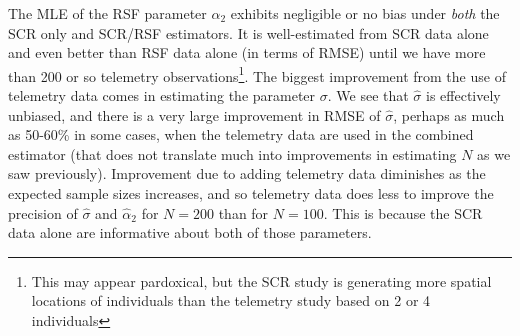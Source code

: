 \documentclass[12pt]{article}
\begin{document}
The MLE of the RSF parameter $\alpha_{2}$ exhibits negligible or no
bias under {\it both} the SCR only and SCR/RSF estimators. It is
well-estimated from SCR data alone and even better than RSF data alone
(in terms of RMSE) until we have more than 200 or so telemetry
observations\footnote{This may appear pardoxical, but the SCR study is
  generating more spatial locations of individuals than the telemetry
  study based on 2 or 4 individuals}.  The biggest improvement from the use of telemetry data
comes in estimating the parameter $\sigma$. We see that $\hat{\sigma}$
is effectively unbiased, and there is a very large improvement in RMSE
of $\hat{\sigma}$, perhaps as much as 50-60\% in some cases, when the
telemetry data are used in the combined estimator (that does not
translate much into improvements in estimating $N$ as we saw
previously).  Improvement due to adding telemetry data diminishes as
the expected sample sizes increases, and so telemetry data does less
to improve the precision of $\hat{\sigma}$ and $\hat{\alpha}_{2}$ for
$N=200$ than for $N=100$. This is because the SCR data alone are
informative about both of those parameters.
\end{document}
